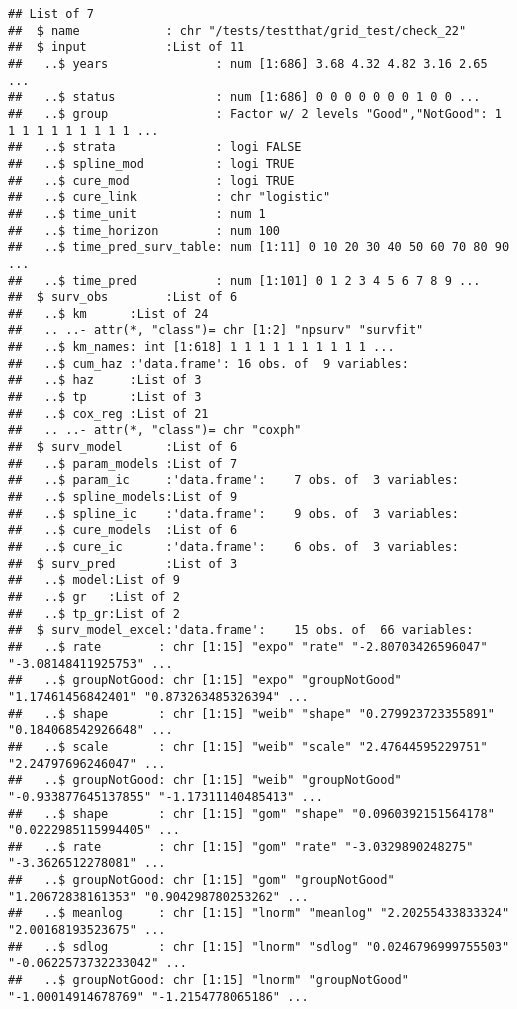 \documentclass[
]{article}
\begin{document}
\begin{verbatim}
## List of 7
##  $ name            : chr "/tests/testthat/grid_test/check_22"
##  $ input           :List of 11
##   ..$ years               : num [1:686] 3.68 4.32 4.82 3.16 2.65 ...
##   ..$ status              : num [1:686] 0 0 0 0 0 0 0 1 0 0 ...
##   ..$ group               : Factor w/ 2 levels "Good","NotGood": 1 1 1 1 1 1 1 1 1 1 ...
##   ..$ strata              : logi FALSE
##   ..$ spline_mod          : logi TRUE
##   ..$ cure_mod            : logi TRUE
##   ..$ cure_link           : chr "logistic"
##   ..$ time_unit           : num 1
##   ..$ time_horizon        : num 100
##   ..$ time_pred_surv_table: num [1:11] 0 10 20 30 40 50 60 70 80 90 ...
##   ..$ time_pred           : num [1:101] 0 1 2 3 4 5 6 7 8 9 ...
##  $ surv_obs        :List of 6
##   ..$ km      :List of 24
##   .. ..- attr(*, "class")= chr [1:2] "npsurv" "survfit"
##   ..$ km_names: int [1:618] 1 1 1 1 1 1 1 1 1 1 ...
##   ..$ cum_haz :'data.frame': 16 obs. of  9 variables:
##   ..$ haz     :List of 3
##   ..$ tp      :List of 3
##   ..$ cox_reg :List of 21
##   .. ..- attr(*, "class")= chr "coxph"
##  $ surv_model      :List of 6
##   ..$ param_models :List of 7
##   ..$ param_ic     :'data.frame':    7 obs. of  3 variables:
##   ..$ spline_models:List of 9
##   ..$ spline_ic    :'data.frame':    9 obs. of  3 variables:
##   ..$ cure_models  :List of 6
##   ..$ cure_ic      :'data.frame':    6 obs. of  3 variables:
##  $ surv_pred       :List of 3
##   ..$ model:List of 9
##   ..$ gr   :List of 2
##   ..$ tp_gr:List of 2
##  $ surv_model_excel:'data.frame':    15 obs. of  66 variables:
##   ..$ rate        : chr [1:15] "expo" "rate" "-2.80703426596047" "-3.08148411925753" ...
##   ..$ groupNotGood: chr [1:15] "expo" "groupNotGood" "1.17461456842401" "0.873263485326394" ...
##   ..$ shape       : chr [1:15] "weib" "shape" "0.279923723355891" "0.184068542926648" ...
##   ..$ scale       : chr [1:15] "weib" "scale" "2.47644595229751" "2.24797696246047" ...
##   ..$ groupNotGood: chr [1:15] "weib" "groupNotGood" "-0.933877645137855" "-1.17311140485413" ...
##   ..$ shape       : chr [1:15] "gom" "shape" "0.0960392151564178" "0.0222985115994405" ...
##   ..$ rate        : chr [1:15] "gom" "rate" "-3.0329890248275" "-3.3626512278081" ...
##   ..$ groupNotGood: chr [1:15] "gom" "groupNotGood" "1.20672838161353" "0.904298780253262" ...
##   ..$ meanlog     : chr [1:15] "lnorm" "meanlog" "2.20255433833324" "2.00168193523675" ...
##   ..$ sdlog       : chr [1:15] "lnorm" "sdlog" "0.0246796999755503" "-0.0622573732233042" ...
##   ..$ groupNotGood: chr [1:15] "lnorm" "groupNotGood" "-1.00014914678769" "-1.2154778065186" ...

\end{verbatim}
\end{document}
